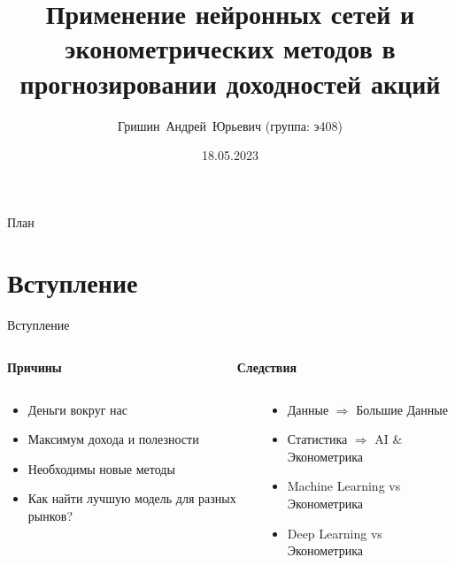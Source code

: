 \documentclass[11pt, aspectratio= 169]{beamer}
\title[Прогнозирование доходностей акций]{Применение нейронных сетей и эконометрических методов в прогнозировании доходностей акций}
\author[Гришин А.Ю.]{Гришин~Андрей~Юрьевич ({\small группа: э408})}
\institute[ЭФ МГУ]{Экономический Факультет Московского Государтвенного Университета}
\date{18.05.2023}
\begin{document}
	\begin{frame}
		\maketitle
	\end{frame}
	
	\begin{frame}{План}
		\tableofcontents
	\end{frame}
	
	\section{Вступление}
	\begin{frame}{Вступление}
		\begin{columns}
			\begin{column}{0.5\textwidth}
				\centering
				\begin{LARGE}
					\textbf{Причины}
				\end{LARGE}
			\end{column}
			\begin{column}{0.5\textwidth}
				\centering
				\begin{LARGE}
					\textbf{Следствия}
				\end{LARGE}
			\end{column}
		\end{columns}
		\vspace{0.3cm}
		\begin{columns}
			\begin{column}{0.5\textwidth}
				\large
				\begin{itemize}
					\item Деньги вокруг нас
					\item Максимум дохода и полезности
					\item Необходимы новые методы
					\item Как найти лучшую модель для разных рынков?
				\end{itemize}
			\end{column}
			\hspace{0.5cm}
			\begin{column}{0.5\textwidth}
				\large
				\begin{itemize}
					\item Данные $\Rightarrow$ Большие Данные
					\item Статистика $\Rightarrow$ AI \& Эконометрика
					\item Machine Learning vs Эконометрика
					\item Deep Learning vs Эконометрика
				\end{itemize}
			\end{column}
		\end{columns}
	\end{frame}
	
\end{document}
